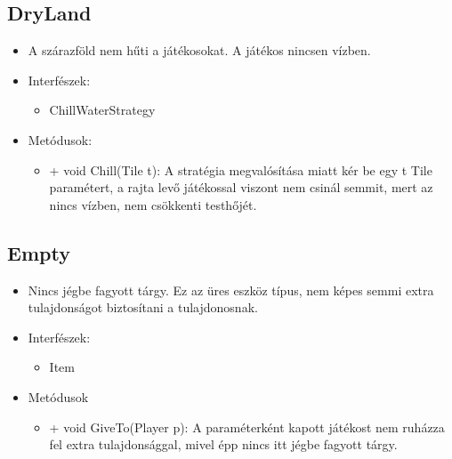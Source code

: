 \subsection{DryLand}
\begin{itemize}
	\item A szárazföld nem hűti a játékosokat. A játékos nincsen vízben.
	\item Interfészek:
	\begin{itemize}
		\item ChillWaterStrategy
	\end{itemize}
	\item Metódusok:
	\begin{itemize}
		\item + void Chill(Tile t): A stratégia megvalósítása miatt kér be egy t Tile paramétert, a rajta levő játékossal viszont nem csinál semmit, mert az nincs vízben, nem csökkenti testhőjét.
	\end{itemize}
\end{itemize}

\subsection{Empty}
\begin{itemize}
	\item Nincs jégbe fagyott tárgy. Ez az üres eszköz típus, nem képes semmi extra tulajdonságot biztosítani a tulajdonosnak.
	\item Interfészek:
	\begin{itemize}
		\item Item
	\end{itemize}
	\item Metódusok
	\begin{itemize}
		\item + void GiveTo(Player p): A paraméterként kapott játékost nem ruházza fel extra tulajdonsággal, mivel épp nincs itt jégbe fagyott tárgy.
	\end{itemize}
\end{itemize}


